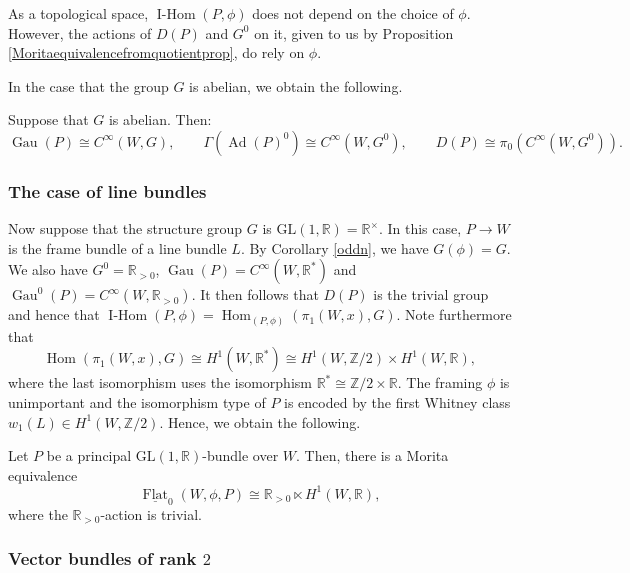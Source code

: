 \documentclass[10pt]{amsart}
\newcommand{\Hom}{\operatorname{Hom}}
\newcommand{\FlatCat}{{\underline{\operatorname{Flat}}}}
\newcommand{\IsotopyObj}{{\operatorname{I-Hom}}}
\DeclareMathOperator{\Gau}{Gau}
\DeclareMathOperator{\Ad}{Ad}
\numberwithin{theoremalpha}{section}
\numberwithin{equation}{section}
\numberwithin{definition}{section}
\numberwithin{theorem}{section}
\numberwithin{proposition}{section}
\numberwithin{lemma}{section}
\numberwithin{example}{section}
\numberwithin{remark}{section}
\numberwithin{corollary}{section}
\numberwithin{question}{section}
\numberwithin{problem}{section}
\numberwithin{assumption}{section}
\theoremstyle{named}
\numberwithin{equation}{section}
\begin{document}
\begin{remark}
As a topological space, $\IsotopyObj(P,\phi)$ does not depend on the choice of $\phi$. However, the actions of $D(P)$ and $G^0$ on it, given to us by Proposition \ref{Moritaequivalencefromquotientprop}, do rely on $\phi$.
\end{remark}

In the case that the group $G$ is abelian, we obtain the following.  
\begin{lemma} \label{lem:DPabelian}
Suppose that $G$ is abelian. Then:
\[ \Gau(P) \cong C^\infty(W,G), \qquad \Gamma(\Ad(P)^0) \cong C^\infty(W,G^0), \qquad D(P) \cong \pi_0(C^\infty(W,G^0)). \]
\end{lemma}


\subsubsection{The case of line bundles}\label{sec:linebundles}

Now suppose that the structure group $G$ is $\mathrm{GL}(1, \mathbb{R}) = \mathbb{R}^{\times}$. In this case, $P \to W$ is the frame bundle of a line bundle $L$. By Corollary \ref{oddn}, we have $G(\phi) = G$. We also have $G^{0} = \mathbb{R}_{>0}$, $\Gau(P) = C^{\infty}(W, \mathbb{R}^*)$ and $\Gau^{0}(P) = C^{\infty}(W, \mathbb{R}_{>0})$. It then follows that $D(P)$ is the trivial group and hence that $\IsotopyObj(P,\phi) = \Hom_{(P,\phi)}(\pi_{1}(W, x), G)$. Note furthermore that 
\[ \Hom(\pi_{1}(W, x), G) \cong H^{1}(W, \mathbb{R}^*) \cong H^{1}(W, \mathbb{Z}/2) \times H^{1}(W, \mathbb{R}), \]
where the last isomorphism uses the isomorphism $\mathbb{R}^* \cong \mathbb{Z}/2 \times \mathbb{R}$. The framing $\phi$ is unimportant and the isomorphism type of $P$ is encoded by the first Whitney class $w_{1}(L) \in H^{1}(W, \mathbb{Z}/2)$. Hence, we obtain the following. 

\begin{corollary} \label{rank1connectedRH}
Let $P$ be a principal $\mathrm{GL}(1, \mathbb{R})$-bundle over $W$. Then, there is a Morita equivalence 
\[ \FlatCat_{0}(W, \phi, P) \cong \mathbb{R}_{>0} \ltimes H^{1}(W, \mathbb{R}), \]
where the $\mathbb{R}_{>0}$-action is trivial.  
\end{corollary}


\subsubsection{Vector bundles of rank $2$} \label{sec:2bundles}
\end{document}
